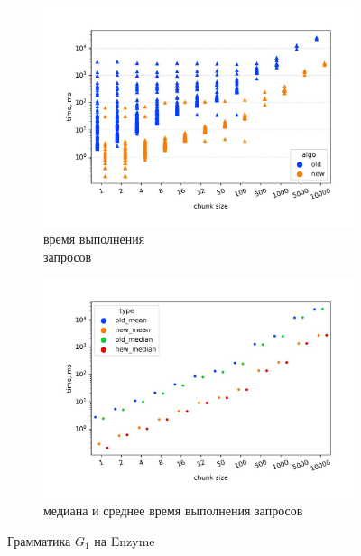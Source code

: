 \documentclass[14pt]{matmex-diploma-custom}
\theoremstyle{definition}
\begin{document}
\begin{figure}[H]
    \begin{subfigure}[b]{0.5\textwidth}
    \centering
    \includegraphics[width=\textwidth]{pics/st_old_new.pdf_1.jpg}  \caption{время выполнения \\ запросов}
    \label{fig:subim1}
    \end{subfigure}%
    \begin{subfigure}[b]{0.5\textwidth}
    \centering
    \includegraphics[width=\columnwidth]{pics/st_old_new_mean&median.pdf_1.jpg} \caption{медиана и среднее время выполнения запросов}
    \label{fig:subim2}
    \end{subfigure} \caption{Грамматика $G_1$ на Enzyme}
    \label{old_new}
        \end{figure} 
\end{document}
